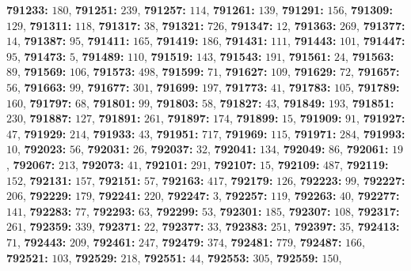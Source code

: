 \textsf{\bfseries 791233:} $180$, \textsf{\bfseries 791251:} $239$, \textsf{\bfseries 791257:} $114$, \textsf{\bfseries 791261:} $139$, \textsf{\bfseries 791291:} $156$, \textsf{\bfseries 791309:} $129$, \textsf{\bfseries 791311:} $118$, \textsf{\bfseries 791317:} $38$, \textsf{\bfseries 791321:} $726$, \textsf{\bfseries 791347:} $12$, \textsf{\bfseries 791363:} $269$, \textsf{\bfseries 791377:} $14$, \textsf{\bfseries 791387:} $95$, \textsf{\bfseries 791411:} $165$, \textsf{\bfseries 791419:} $186$, \textsf{\bfseries 791431:} $111$, \textsf{\bfseries 791443:} $101$, \textsf{\bfseries 791447:} $95$, \textsf{\bfseries 791473:} $5$, \textsf{\bfseries 791489:} $110$, \textsf{\bfseries 791519:} $143$, \textsf{\bfseries 791543:} $191$, \textsf{\bfseries 791561:} $24$, \textsf{\bfseries 791563:} $89$, \textsf{\bfseries 791569:} $106$, \textsf{\bfseries 791573:} $498$, \textsf{\bfseries 791599:} $71$, \textsf{\bfseries 791627:} $109$, \textsf{\bfseries 791629:} $72$, \textsf{\bfseries 791657:} $56$, \textsf{\bfseries 791663:} $99$, \textsf{\bfseries 791677:} $301$, \textsf{\bfseries 791699:} $197$, \textsf{\bfseries 791773:} $41$, \textsf{\bfseries 791783:} $105$, \textsf{\bfseries 791789:} $160$, \textsf{\bfseries 791797:} $68$, \textsf{\bfseries 791801:} $99$, \textsf{\bfseries 791803:} $58$, \textsf{\bfseries 791827:} $43$, \textsf{\bfseries 791849:} $193$, \textsf{\bfseries 791851:} $230$, \textsf{\bfseries 791887:} $127$, \textsf{\bfseries 791891:} $261$, \textsf{\bfseries 791897:} $174$, \textsf{\bfseries 791899:} $15$, \textsf{\bfseries 791909:} $91$, \textsf{\bfseries 791927:} $47$, \textsf{\bfseries 791929:} $214$, \textsf{\bfseries 791933:} $43$, \textsf{\bfseries 791951:} $717$, \textsf{\bfseries 791969:} $115$, \textsf{\bfseries 791971:} $284$, \textsf{\bfseries 791993:} $10$, \textsf{\bfseries 792023:} $56$, \textsf{\bfseries 792031:} $26$, \textsf{\bfseries 792037:} $32$, \textsf{\bfseries 792041:} $134$, \textsf{\bfseries 792049:} $86$, \textsf{\bfseries 792061:} $19$, \textsf{\bfseries 792067:} $213$, \textsf{\bfseries 792073:} $41$, \textsf{\bfseries 792101:} $291$, \textsf{\bfseries 792107:} $15$, \textsf{\bfseries 792109:} $487$, \textsf{\bfseries 792119:} $152$, \textsf{\bfseries 792131:} $157$, \textsf{\bfseries 792151:} $57$, \textsf{\bfseries 792163:} $417$, \textsf{\bfseries 792179:} $126$, \textsf{\bfseries 792223:} $99$, \textsf{\bfseries 792227:} $206$, \textsf{\bfseries 792229:} $179$, \textsf{\bfseries 792241:} $220$, \textsf{\bfseries 792247:} $3$, \textsf{\bfseries 792257:} $119$, \textsf{\bfseries 792263:} $40$, \textsf{\bfseries 792277:} $141$, \textsf{\bfseries 792283:} $77$, \textsf{\bfseries 792293:} $63$, \textsf{\bfseries 792299:} $53$, \textsf{\bfseries 792301:} $185$, \textsf{\bfseries 792307:} $108$, \textsf{\bfseries 792317:} $261$, \textsf{\bfseries 792359:} $339$, \textsf{\bfseries 792371:} $22$, \textsf{\bfseries 792377:} $33$, \textsf{\bfseries 792383:} $251$, \textsf{\bfseries 792397:} $35$, \textsf{\bfseries 792413:} $71$, \textsf{\bfseries 792443:} $209$, \textsf{\bfseries 792461:} $247$, \textsf{\bfseries 792479:} $374$, \textsf{\bfseries 792481:} $779$, \textsf{\bfseries 792487:} $166$, \textsf{\bfseries 792521:} $103$, \textsf{\bfseries 792529:} $218$, \textsf{\bfseries 792551:} $44$, \textsf{\bfseries 792553:} $305$, \textsf{\bfseries 792559:} $150$, 
